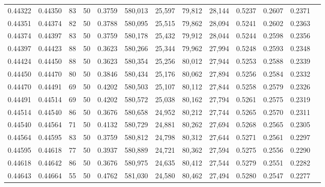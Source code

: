 \begin{tabular}{rrrrrrrrrrrrr}
0.44322 & 0.44350 &    83 &  50 &                                     0.3759 & 580,013 &  25,597 &  79,812 &  28,144 & 0.5237 & 0.2607 & 0.2371 \\
0.44351 & 0.44374 &    82 &  50 &                                     0.3788 & 580,095 &  25,515 &  79,862 &  28,094 & 0.5241 & 0.2602 & 0.2363 \\
0.44374 & 0.44397 &    83 &  50 &                                     0.3759 & 580,178 &  25,432 &  79,912 &  28,044 & 0.5244 & 0.2598 & 0.2356 \\
0.44397 & 0.44423 &    88 &  50 &                                     0.3623 & 580,266 &  25,344 &  79,962 &  27,994 & 0.5248 & 0.2593 & 0.2348 \\
0.44424 & 0.44450 &    88 &  50 &                                     0.3623 & 580,354 &  25,256 &  80,012 &  27,944 & 0.5253 & 0.2588 & 0.2339 \\
0.44450 & 0.44470 &    80 &  50 &                                     0.3846 & 580,434 &  25,176 &  80,062 &  27,894 & 0.5256 & 0.2584 & 0.2332 \\
0.44470 & 0.44491 &    69 &  50 &                                     0.4202 & 580,503 &  25,107 &  80,112 &  27,844 & 0.5258 & 0.2579 & 0.2326 \\
0.44491 & 0.44514 &    69 &  50 &                                     0.4202 & 580,572 &  25,038 &  80,162 &  27,794 & 0.5261 & 0.2575 & 0.2319 \\
0.44514 & 0.44540 &    86 &  50 &                                     0.3676 & 580,658 &  24,952 &  80,212 &  27,744 & 0.5265 & 0.2570 & 0.2311 \\
0.44540 & 0.44564 &    71 &  50 &                                     0.4132 & 580,729 &  24,881 &  80,262 &  27,694 & 0.5268 & 0.2565 & 0.2305 \\
0.44564 & 0.44595 &    83 &  50 &                                     0.3759 & 580,812 &  24,798 &  80,312 &  27,644 & 0.5271 & 0.2561 & 0.2297 \\
0.44595 & 0.44618 &    77 &  50 &                                     0.3937 & 580,889 &  24,721 &  80,362 &  27,594 & 0.5275 & 0.2556 & 0.2290 \\
0.44618 & 0.44642 &    86 &  50 &                                     0.3676 & 580,975 &  24,635 &  80,412 &  27,544 & 0.5279 & 0.2551 & 0.2282 \\
0.44643 & 0.44664 &    55 &  50 &                                     0.4762 & 581,030 &  24,580 &  80,462 &  27,494 & 0.5280 & 0.2547 & 0.2277 \\

\end{tabular}
